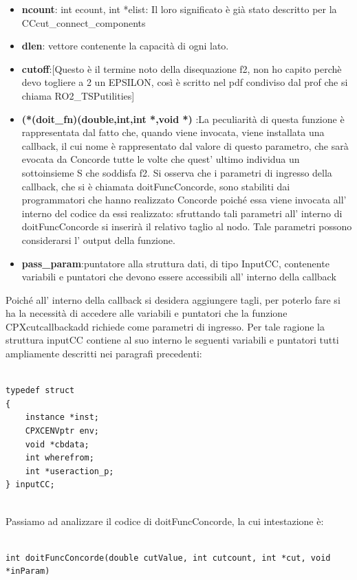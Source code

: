 \documentclass[11pt]{article}
\begin{document}
\begin{itemize}
	\item \textbf{ncount}: int ecount, int *elist: Il loro significato è già stato descritto per la CCcut_connect_components
	\item \textbf{dlen}: vettore contenente la capacità di ogni lato. 
	\item \textbf{cutoff}:[Questo è il termine noto della disequazione f2, non ho capito perchè devo togliere a 2 un EPSILON, così è scritto nel pdf condiviso dal prof che si chiama 		RO2_TSPutilities]
	\item \textbf{(*(doit_fn)(double,int,int *,void *) }:La peculiarità di questa funzione è rappresentata dal fatto che, quando viene invocata, viene installata una callback, il cui nome è rappresentato dal valore di questo parametro, che sarà evocata da Concorde tutte le volte che quest' ultimo individua un sottoinsieme S che soddisfa f2. Si osserva che i parametri di ingresso della callback, che si è chiamata doitFuncConcorde, sono stabiliti dai programmatori che hanno realizzato Concorde poiché essa viene invocata all' interno del codice da essi realizzato: sfruttando tali parametri all' interno di doitFuncConcorde si inserirà il relativo taglio al nodo. Tale parametri possono considerarsi l' output della funzione.
	\item \textbf{pass_param}:puntatore alla struttura dati, di tipo InputCC, contenente variabili e puntatori che devono essere accessibili all’ interno della callback 
\end{itemize}

Poiché all' interno della callback si desidera aggiungere tagli, per poterlo fare si ha la necessità di accedere alle variabili e puntatori che la funzione CPXcutcallbackadd richiede come parametri di ingresso. Per tale ragione la struttura inputCC contiene al suo interno le seguenti variabili e puntatori tutti ampliamente descritti nei paragrafi precedenti:

\begin{lstlisting}

typedef struct 
{ 
	instance *inst;
	CPXCENVptr env;
	void *cbdata;
	int wherefrom;
	int *useraction_p;
} inputCC;


\end{lstlisting}


Passiamo ad analizzare il codice di doitFuncConcorde, la cui intestazione è:

\begin{lstlisting}

int doitFuncConcorde(double cutValue, int cutcount, int *cut, void *inParam)

\end{lstlisting}
\end{document}
